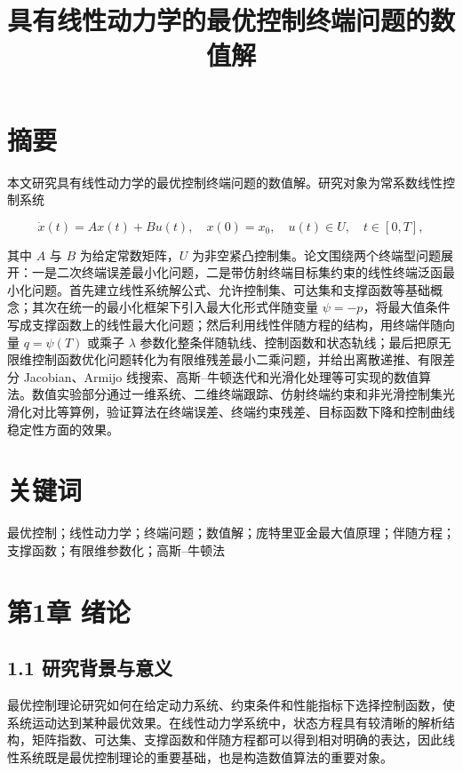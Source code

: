 \documentclass[UTF8,a4paper,zihao=-4]{ctexart}
\title{具有线性动力学的最优控制终端问题的数值解}
\author{}
\date{}
\begin{document}
\maketitle
\tableofcontents
\newpage

\section{摘要}

本文研究具有线性动力学的最优控制终端问题的数值解。研究对象为常系数线性控制系统

\[
\dot{x}(t)=Ax(t)+Bu(t),\quad x(0)=x_0,\quad u(t)\in U,\quad t\in[0,T],
\]

其中 $A$ 与 $B$ 为给定常数矩阵，$U$ 为非空紧凸控制集。论文围绕两个终端型问题展开：一是二次终端误差最小化问题，二是带仿射终端目标集约束的线性终端泛函最小化问题。首先建立线性系统解公式、允许控制集、可达集和支撑函数等基础概念；其次在统一的最小化框架下引入最大化形式伴随变量 $\psi=-p$，将最大值条件写成支撑函数上的线性最大化问题；然后利用线性伴随方程的结构，用终端伴随向量 $q=\psi(T)$ 或乘子 $\lambda$ 参数化整条伴随轨线、控制函数和状态轨线；最后把原无限维控制函数优化问题转化为有限维残差最小二乘问题，并给出离散递推、有限差分 Jacobian、Armijo 线搜索、高斯--牛顿迭代和光滑化处理等可实现的数值算法。数值实验部分通过一维系统、二维终端跟踪、仿射终端约束和非光滑控制集光滑化对比等算例，验证算法在终端误差、终端约束残差、目标函数下降和控制曲线稳定性方面的效果。

\section{关键词}

最优控制；线性动力学；终端问题；数值解；庞特里亚金最大值原理；伴随方程；支撑函数；有限维参数化；高斯--牛顿法

\section{第1章 绪论}

\subsection{1.1 研究背景与意义}

最优控制理论研究如何在给定动力系统、约束条件和性能指标下选择控制函数，使系统运动达到某种最优效果\cite[第13--27页]{pontryagin1969}\cite[第76--91页]{lee1972}\cite[第8--15页]{blagodatskikh2001}。在线性动力学系统中，状态方程具有较清晰的解析结构，矩阵指数、可达集、支撑函数和伴随方程都可以得到相对明确的表达，因此线性系统既是最优控制理论的重要基础，也是构造数值算法的重要对象。
\end{document}
